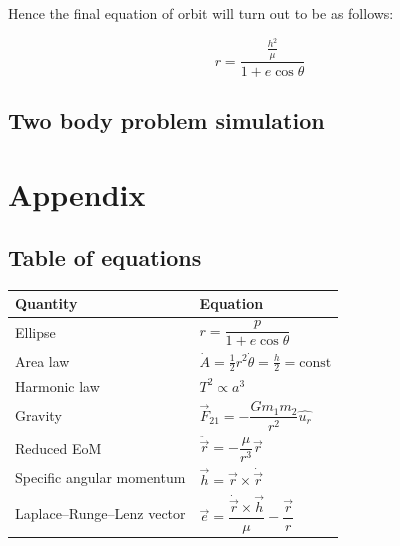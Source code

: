 \documentclass[
  letterpaper,
  DIV=11,
  numbers=noendperiod]{scrreprt}
\begin{document}
Hence the final equation of orbit will turn out to be as follows:

\[
\boxed{r=\frac{\frac{h^2}{\mu}}{1+e\cos{\theta}}}
\]

\section{Two body problem simulation}\label{two-body-problem-simulation}


\chapter*{Appendix}\label{sec-appendix}


\section*{Table of equations}\label{table-of-equations}


\begin{longtable}[]{@{}
  >{\raggedright\arraybackslash}p{}
  >{\raggedright\arraybackslash}p{}@{}}
\toprule\noalign{}
\begin{minipage}[b]{\linewidth}\raggedright
Quantity
\end{minipage} & \begin{minipage}[b]{\linewidth}\raggedright
Equation
\end{minipage} \\
\midrule\noalign{}
\endhead
\bottomrule\noalign{}
\endlastfoot
Ellipse & \(r=\dfrac{p}{1+e\cos\theta}\) \\
Area law &
\(\dot A=\frac12 r^{2}\dot\theta =\frac{h}{2}= \text{const}\) \\
Harmonic law & \(T^{2}\propto a^{3}\) \\
Gravity & \(\vec F_{21} = -\dfrac{Gm_{1}m_{2}}{r^{2}}\hat{u_r}\) \\
Reduced EoM & \(\ddot{\vec r}=-\dfrac{\mu}{r^{3}}\vec r\) \\
Specific angular momentum & \(\vec h=\vec r\times\dot{\vec r}\) \\
Laplace--Runge--Lenz vector &
\(\vec e=\dfrac{\dot{\vec r}\times\vec h}{\mu}-\dfrac{\vec r}{r}\) \\
\end{longtable}
\end{document}
